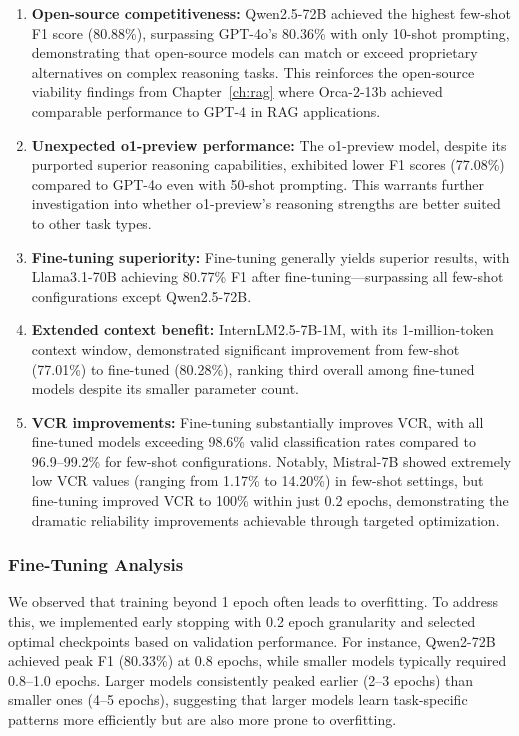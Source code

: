 \begin{enumerate}[leftmargin=*]
    \item \textbf{Open-source competitiveness:} Qwen2.5-72B achieved the highest few-shot F1 score (80.88\%), surpassing GPT-4o's 80.36\% with only 10-shot prompting, demonstrating that open-source models can match or exceed proprietary alternatives on complex reasoning tasks. This reinforces the open-source viability findings from Chapter~\ref{ch:rag} where Orca-2-13b achieved comparable performance to GPT-4 in RAG applications.
    
    \item \textbf{Unexpected o1-preview performance:} The o1-preview model, despite its purported superior reasoning capabilities, exhibited lower F1 scores (77.08\%) compared to GPT-4o even with 50-shot prompting. This warrants further investigation into whether o1-preview's reasoning strengths are better suited to other task types.
    
    \item \textbf{Fine-tuning superiority:} Fine-tuning generally yields superior results, with Llama3.1-70B achieving 80.77\% F1 after fine-tuning---surpassing all few-shot configurations except Qwen2.5-72B.
    
    \item \textbf{Extended context benefit:} InternLM2.5-7B-1M, with its 1-million-token context window, demonstrated significant improvement from few-shot (77.01\%) to fine-tuned (80.28\%), ranking third overall among fine-tuned models despite its smaller parameter count.
    
    \item \textbf{VCR improvements:} Fine-tuning substantially improves VCR, with all fine-tuned models exceeding 98.6\% valid classification rates compared to 96.9--99.2\% for few-shot configurations. Notably, Mistral-7B showed extremely low VCR values (ranging from 1.17\% to 14.20\%) in few-shot settings, but fine-tuning improved VCR to 100\% within just 0.2 epochs, demonstrating the dramatic reliability improvements achievable through targeted optimization.
\end{enumerate}

\subsubsection{Fine-Tuning Analysis}

We observed that training beyond 1 epoch often leads to overfitting. To address this, we implemented early stopping with 0.2 epoch granularity and selected optimal checkpoints based on validation performance. For instance, Qwen2-72B achieved peak F1 (80.33\%) at 0.8 epochs, while smaller models typically required 0.8--1.0 epochs. Larger models consistently peaked earlier (2--3 epochs) than smaller ones (4--5 epochs), suggesting that larger models learn task-specific patterns more efficiently but are also more prone to overfitting.

